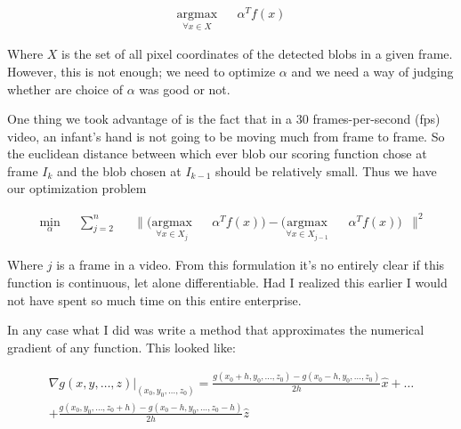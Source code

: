 \documentclass[11pt]{article}
\begin{document}
\begin{equation*}
\begin{aligned}
\underset{\forall x \in X}{\text{argmax}}
& & \alpha^{T}f(x)

\end{aligned}
\end{equation*}

Where \(X\) is the set of all pixel coordinates of the detected blobs in a given frame. However, this is not enough; we need to optimize \(\alpha\) and we need a way of judging whether are choice of \(\alpha\) was good or not. 

One thing we took advantage of is the fact that in a 30 frames-per-second (fps) video, an infant's hand is not going to be moving much from frame to frame. So the euclidean distance between which ever blob our scoring function chose at frame \(I_{k}\) and the blob chosen at \(I_{k-1}\) should be relatively small. Thus we have our optimization problem 



\begin{equation*}
\begin{aligned}
\underset{\alpha}{\text{min}} & & \sum_{j = 2}^{n} & &  \lVert (\underset{\forall x \in X_{j}}{\text{argmax}} & & \alpha^{T}f(x))  - (\underset{\forall x \in X_{j-1}}{\text{argmax}} & &  \alpha^{T}f(x)) & \rVert^{2}

\end{aligned}
\end{equation*}

Where \(j\) is a frame in a video. From this formulation it's no entirely clear if this function is continuous, let alone differentiable. Had I realized this earlier I would not have spent so much time on this entire enterprise.

In any case what I did was write a method that approximates the numerical gradient of any function. This looked like:

\begin{equation*}
\begin{aligned}
\nabla g(x,y,\ldots,z) \bigg\rvert_{(x_{0},y_{0}, \ldots ,z_{0})} = \frac{g(x_{0} + h,y_{0}, \ldots ,z_{0}) - g(x_{0} - h,y_{0}, \ldots ,z_{0})}{2h}\hat{x} + \ldots  \\
+  \frac{g(x_{0} ,y_{0}, \ldots ,z_{0} + h) - g(x_{0} - h,y_{0}, \ldots ,z_{0} - h )}{2h}\hat{z} 
\end{aligned}
\end{equation*}
\end{document}
